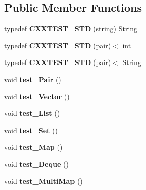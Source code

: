\subsection*{Public Member Functions}
\begin{DoxyCompactItemize}
\item 
\hypertarget{classStlTraits_a754df187336184daef3b3d007acfdb1b}{typedef {\bfseries C\-X\-X\-T\-E\-S\-T\-\_\-\-S\-T\-D} (string) String}\label{classStlTraits_a754df187336184daef3b3d007acfdb1b}

\item 
\hypertarget{classStlTraits_a2ce51a03e7cdd70e28fec6ad91c937c2}{typedef {\bfseries C\-X\-X\-T\-E\-S\-T\-\_\-\-S\-T\-D} (pair)$<$ int}\label{classStlTraits_a2ce51a03e7cdd70e28fec6ad91c937c2}

\item 
\hypertarget{classStlTraits_a86fbd2bbc649772afec18e7acb7f0cf8}{typedef {\bfseries C\-X\-X\-T\-E\-S\-T\-\_\-\-S\-T\-D} (pair)$<$ String}\label{classStlTraits_a86fbd2bbc649772afec18e7acb7f0cf8}

\item 
\hypertarget{classStlTraits_a3635bccb4e061daa7094b414c270e46a}{void {\bfseries test\-\_\-\-Pair} ()}\label{classStlTraits_a3635bccb4e061daa7094b414c270e46a}

\item 
\hypertarget{classStlTraits_ad7aafeae3ceb26de043cbb9895b6a840}{void {\bfseries test\-\_\-\-Vector} ()}\label{classStlTraits_ad7aafeae3ceb26de043cbb9895b6a840}

\item 
\hypertarget{classStlTraits_a6d35b02b98f356675ba6b55dcf61282e}{void {\bfseries test\-\_\-\-List} ()}\label{classStlTraits_a6d35b02b98f356675ba6b55dcf61282e}

\item 
\hypertarget{classStlTraits_a736c3c98da0512601aaff6cce8ea4f60}{void {\bfseries test\-\_\-\-Set} ()}\label{classStlTraits_a736c3c98da0512601aaff6cce8ea4f60}

\item 
\hypertarget{classStlTraits_a6fec1aaa3bddf1e35b196fdd8d1c4a3d}{void {\bfseries test\-\_\-\-Map} ()}\label{classStlTraits_a6fec1aaa3bddf1e35b196fdd8d1c4a3d}

\item 
\hypertarget{classStlTraits_a4892fc689477e18611f64d167e9a8f8c}{void {\bfseries test\-\_\-\-Deque} ()}\label{classStlTraits_a4892fc689477e18611f64d167e9a8f8c}

\item 
\hypertarget{classStlTraits_a94008e26df40fdbf24207b80fadec9a9}{void {\bfseries test\-\_\-\-Multi\-Map} ()}\label{classStlTraits_a94008e26df40fdbf24207b80fadec9a9}


\end{DoxyCompactItemize}
